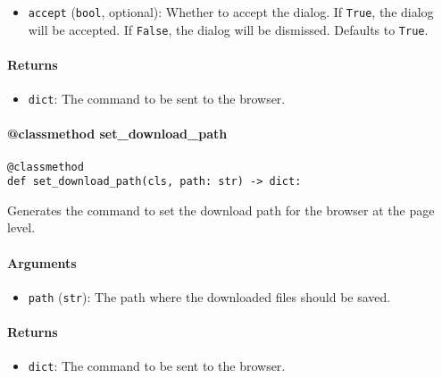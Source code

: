 \documentclass{article}
\begin{document}
\begin{itemize}
    \item \lstinline[style=pythonstyle]|accept| (\lstinline[style=pythonstyle]|bool|, optional): Whether to accept the dialog. If \lstinline[style=pythonstyle]|True|, the dialog will be accepted. If \lstinline[style=pythonstyle]|False|, the dialog will be dismissed. Defaults to \lstinline[style=pythonstyle]|True|.
\end{itemize}

\paragraph{Returns}

\begin{itemize}
    \item \lstinline[style=pythonstyle]|dict|: The command to be sent to the browser.
\end{itemize}

\paragraph{@classmethod set\_download\_path}

\begin{lstlisting}[style=pythonstyle]
@classmethod
def set_download_path(cls, path: str) -> dict:
\end{lstlisting}

\noindent Generates the command to set the download path for the browser at the page level.

\paragraph{Arguments}

\begin{itemize}
    \item \lstinline[style=pythonstyle]|path| (\lstinline[style=pythonstyle]|str|): The path where the downloaded files should be saved.
\end{itemize}

\paragraph{Returns}

\begin{itemize}
    \item \lstinline[style=pythonstyle]|dict|: The command to be sent to the browser.
\end{itemize}
\end{document}
